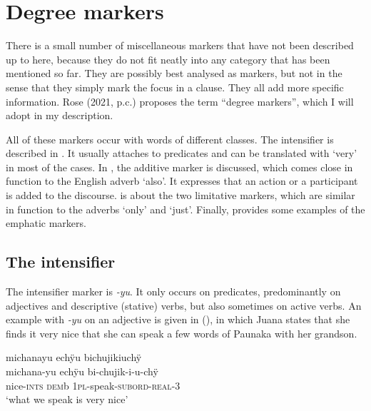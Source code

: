 \section{Degree markers}\label{sec:MiscellaneousMarkers}

There is a small number of miscellaneous markers that have not been described up to here, because they do not fit neatly into any category that has been mentioned so far. They are possibly best analysed as  markers, but not in the sense that they simply mark the focus in a clause. They all add more specific information. Rose (2021, p.c.) proposes the term “degree markers”, which I will adopt in my description.

All of these markers occur with words of different classes. The intensifier is described in . It usually attaches to predicates and can be translated with ‘very’ in most of the cases. In , the additive marker is discussed, which comes close in function to the English adverb ‘also’. It expresses that an action or a participant is added to the discourse.  is about the two limitative markers, which are similar in function to the adverbs ‘only’ and ‘just’. Finally,  provides some examples of the emphatic markers.

\subsection{The intensifier}\label{sec:Intensifier}

The intensifier marker is \textit{-yu}. It only occurs on predicates, predominantly on adjectives and descriptive (stative) verbs, but also sometimes on active verbs. An example with \textit{-yu} on an adjective is given in (), in which Juana states that she finds it very nice that she can speak a few words of Paunaka with her grandson.

\ea\label{ex:yu-ADJ}
\begingl
\glpreamble michanayu echÿu bichujikiuchÿ \\
\gla michana-yu echÿu bi-chujik-i-u-chÿ \\
\glb nice-\textsc{ints} \textsc{dem}b 1\textsc{pl}-speak-\textsc{subord}-\textsc{real}-3\\
\glft ‘what we speak is very nice’
\endgl
\trailingcitation{[jxx-x110916.31]}
\xe

